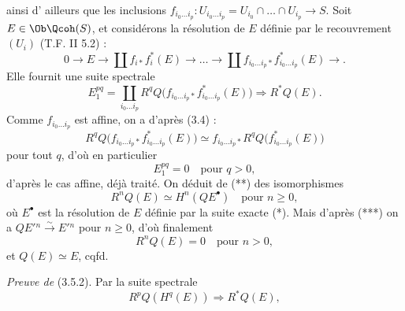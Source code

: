ainsi d'%
ailleurs que les inclusions $f_{i_0\ldots i_p}:U_{i_0\ldots i_p}=U_{i_0}\cap\ldots\cap U_{i_p}\longrightarrow S$. Soit $E\in\Ob\Qcoh(S)$, et considérons la résolution de $E$ définie par le recouvrement $(U_i)$ (T.F. II 5.2) :
\begin{equation}\tag{*}
 0\longrightarrow E\longrightarrow \coprod f_{i*}f_i^*(E)\longrightarrow\ldots\longrightarrow
 \coprod f_{i_0\ldots i_p*}f_{i_0\ldots i_p}^*(E)\longrightarrow .
\end{equation}
Elle fournit une suite spectrale
\begin{equation}\tag{**}
 E_1^{pq}=\coprod_{i_0\ldots i_p}R^qQ\bigl(f_{i_0\ldots i_p*}f_{i_0\ldots i_p}^*(E)\bigr)
 \Longrightarrow R^{*}Q(E).
\end{equation}
Comme $f_{i_0\ldots i_p}$ est affine, on a d'après (3.4) :
\begin{equation}\tag{***}
 R^qQ\bigl(f_{i_0\ldots i_p*}f_{i_0\ldots i_p}^*(E)\bigr)
 \simeq f_{i_0\ldots i_p*}R^qQ\bigl(f_{i_0\ldots i_p}^*(E)\bigr)
\end{equation}
pour tout $q$, d'où en particulier
\[
 E_1^{pq}=0\quad\text{pour }q>0,
\]
d'après le cas affine, déjà traité. On déduit de (**) des isomorphismes
\[
 R^nQ(E)\simeq H^n(QE^\bullet)\quad\text{pour }n\geq0,
\]
où $E^\bullet$ est la résolution de $E$ définie par la suite exacte (*). Mais d'après (***) on a $QE'{}^n\xrightarrow{\sim} E'{}^n$ pour $n\geq0$, d'où finalement
\[
 R^nQ(E)=0\quad\text{pour }n>0,
\]
et $Q(E)\simeq E$, cqfd.

\emph{Preuve de} (3.5.2). Par la suite spectrale
\[
 R^pQ(H^q(E))\Longrightarrow R^{*}Q(E),
\]

